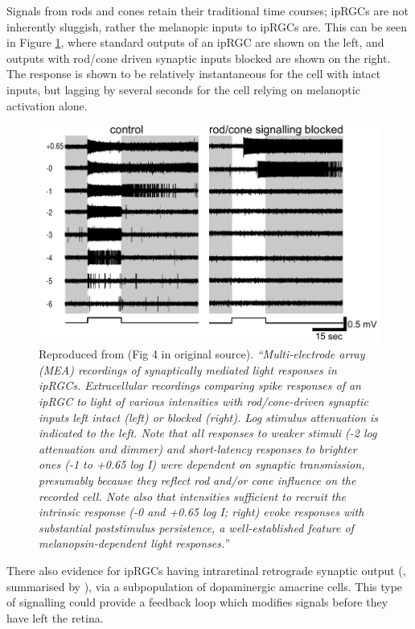 Signals from rods and cones retain their traditional time courses; \glspl{ipRGC} are not inherently sluggish, rather the melanopic inputs to \glspl{ipRGC} are. This can be seen in Figure \ref{fig:wong}, where standard outputs of an \gls{ipRGC} are shown on the left, and outputs with rod/cone driven synaptic inputs blocked are shown on the right. The response is shown to be relatively instantaneous for the cell with intact inputs, but lagging by several seconds for the cell relying on melanoptic activation alone.

\begin{figure}[htbp]
\includegraphics[max width=\textwidth, center]{figs/LitRev/wong.png}
\caption{Reproduced from \citet{wong_synaptic_2007} (Fig 4 in original source). \textit{``Multi-electrode array (MEA) recordings of synaptically mediated light responses in ipRGCs. Extracellular recordings comparing spike responses of an ipRGC to light of various intensities with rod/cone-driven synaptic inputs left intact (left) or blocked (right). Log stimulus attenuation is indicated to the left. Note that all responses to weaker stimuli (-2 log attenuation and dimmer) and short-latency responses to brighter ones (-1 to +0.65 log I) were dependent on synaptic transmission, presumably because they reflect rod and/or cone influence on the recorded cell. Note also that intensities sufficient to recruit the intrinsic response (-0 and +0.65 log I; right) evoke responses with substantial poststimulus persistence, a well-established feature of melanopsin-dependent light responses.''}}
\label{fig:wong}
\end{figure}

There also evidence for \glspl{ipRGC} having intraretinal retrograde synaptic output (\citet{zhang_intraretinal_2008,zhang_melanopsin_2012}, summarised by \citet{graham_melanopsin-expressing_2016}), via a subpopulation of dopaminergic amacrine cells. This type of signalling could provide a feedback loop which modifies signals before they have left the retina.

